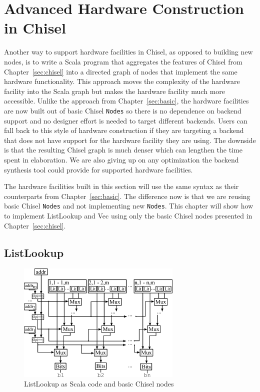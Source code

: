 \section{Advanced Hardware Construction in Chisel}
\label{sec:advanced}
Another way to support hardware facilities in Chisel, as opposed to
building new nodes, is to write a Scala program that aggregates the
features of Chisel from Chapter~\ref{sec:chisel} into a directed graph
of nodes that implement the same hardware functionality. This approach
moves the complexity of the hardware facility into the Scala graph but
makes the hardware facility much more accessible.
Unlike the approach from Chapter~\ref{sec:basic}, the
hardware facilities are now built out of basic Chisel {\tt Nodes} so
there is no dependence on backend support and no designer effort is
needed to target different backends. Users can fall back to this style
of hardware construction if they are targeting a backend that does
not have support for the hardware facility they are using. The
downside is that the resulting Chisel graph is much denser which can
lengthen the time spent in elaboration. We are also giving up on any
optimization the backend synthesis tool could provide for supported
hardware facilities.

The hardware facilities built in this section will use the same syntax
as their counterparts from Chapter~\ref{sec:basic}. The difference now
is that we are reusing basic Chisel {\tt Nodes} and not implementing
new {\tt Nodes}. This chapter will show how to implement ListLookup
and Vec using only the basic Chisel nodes presented in
Chapter~\ref{sec:chisel}.

\subsection{ListLookup}
\begin{figure}[htb]
\centering
\includegraphics[width=0.7\textwidth]{figures/listlookupscala.pdf}
\caption{ListLookup as Scala code and basic Chisel nodes}
\label{fig:llscala}
\end{figure}

